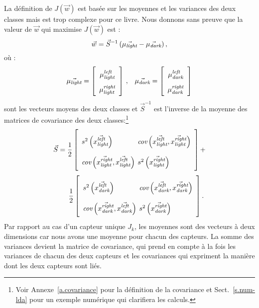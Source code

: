 La définition de $J(\vec{w})$ est basée sur les moyennes et les variances des deux classes mais est trop complexe pour ce livre. Nous donnons sans preuve que la valeur de $\vec{w}$ qui maximise $J(\vec{w})$ est :
\begin{equation}
\vec{w} = \vec{S}^{-1}\,(\vec{\mu_{\textit{\scriptsize light}}}-\vec{\mu_{\textit{\scriptsize dark}}})\,,\label{eq.wLDA}
\end{equation}
où :
\[
\renewcommand{\arraystretch}{1.8}
\vec{\mu_{\sub{light}}}=\left[
\begin{array}{c}\mu_{\sub{light}}^{\sub{left}}\\
\mu_{\sub{light}}^{\sub{right}}\end{array}
\right]\,,\;\;\;
\vec{\mu_{\sub{dark}}}=\left[
\begin{array}{c}\mu_{\sub{dark}}^{\sub{left}}\\
\mu_{\sub{dark}}^{\sub{right}}\end{array}\right]
\]
sont les vecteurs moyens des deux classes et $\vec{S}^{-1}$ est l'inverse de la moyenne des matrices de covariance des deux classes:\footnote{Voir Annexe~\ref{a.covariance} pour la définition de la covariance et Sect.~\ref{s.num-lda} pour un exemple numérique qui clarifiera les calculs.}
\[
\renewcommand{\arraystretch}{2.5}
\vec{S} = \frac{1}{2}
\left[\begin{array}{l@{\hspace{.4em}}l}
s^2\left(\vec{x^{\sub{left}}_\sub{light}}\right) &
\textit{cov}\left(\vec{x^{\sub{left}}_\sub{light}},\vec{x^{\sub{right}}_\sub{light}}\right)\\
\textit{cov}\left(\vec{x^{\sub{right}}_\sub{light}},\vec{x^{\sub{left}}_\sub{light}}\right)&
s^2\left(\vec{x^{\sub{right}}_\sub{light}}\right)
\end{array}\right]
+
\]
\[
\renewcommand{\arraystretch}{2.5}
\qquad\frac{1}{2}\left[\begin{array}{l@{\hspace{.4em}}l}
s^2\left(\vec{x^{\sub{left}}_\sub{dark}}\right)&
\textit{cov}\left(\vec{x^{\sub{left}}_\sub{dark}},\vec{x^{\sub{right}}_\sub{dark}}\right)\\
\textit{cov}\left(\vec{x^{\sub{right}}_\sub{dark}},\vec{x^{\sub{left}}_\sub{dark}}\right)&
s^2\left(\vec{x^{\sub{right}}_\sub{dark}}\right)
\end{array}\right].
\]
Par rapport au cas d'un capteur unique $J_k$, les moyennes sont des vecteurs à deux dimensions car nous avons une moyenne pour chacun des capteurs. La somme des variances devient la matrice de covariance, qui prend en compte à la fois les variances de chacun des deux capteurs et les covariances qui expriment la manière dont les deux capteurs sont liés.


